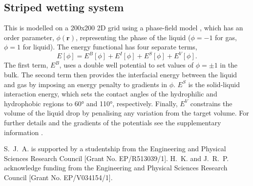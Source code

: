 \documentclass[twocolumn,10pt]{revtex4-2}
\begin{document}
\subsection{Striped wetting system}
This is modelled on a 200x200 2D grid using a phase-field model \cite{Panter2019b}, which has an order parameter, $\phi(\bm{r})$, representing the phase of the liquid ($\phi=-1$ for gas, $\phi=1$ for liquid).
The energy functional has four separate terms,
\begin{equation} \label{eq:phasefield}
  E[\phi] = E^B[\phi] + E^I[\phi] + E^S[\phi] + E^V[\phi].
\end{equation}
The first term, $E^B$, uses a double well potential to set values of $\phi=\pm1$ in the bulk.
The second term then provides the interfacial energy between the liquid and gas by imposing an energy penalty to gradients in $\phi$.
$E^S$ is the solid-liquid interaction energy, which sets the contact angles of the hydrophilic and hydrophobic regions to 60\si{\degree} and 110\si{\degree}, respectively.
Finally, $E^V$ constrains the volume of the liquid drop by penalising any variation from the target volume.
For further details and the gradients of the potentials see the supplementary information \cite{Note1}.


\appendix

\begin{acknowledgments}
  S.~J.~A. is supported by a studentship from the Engineering and Physical Sciences Research Council [Grant No. EP/R513039/1].
  H.~K. and J.~R.~P. acknowledge funding from the Engineering and Physical Sciences Research Council [Grant No. EP/V034154/1].
\end{acknowledgments}
\end{document}
